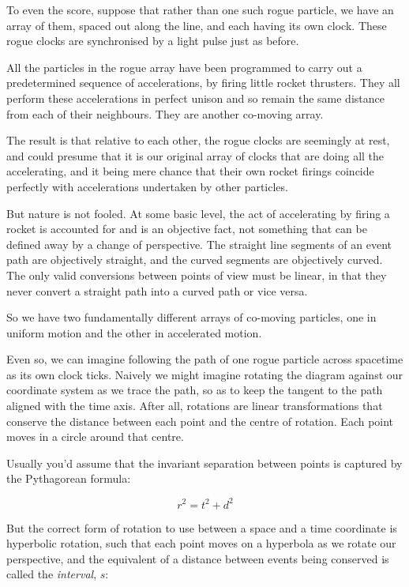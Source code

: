To even the score, suppose that rather than one such rogue particle, we have an array of them, spaced out along the line, and each having its own clock. These rogue clocks are synchronised by a light pulse just as before.

All the particles in the rogue array have been programmed to carry out a predetermined sequence of accelerations, by firing little rocket thrusters. They all perform these accelerations in perfect unison and so remain the same distance from each of their neighbours. They are another co-moving array.

The result is that relative to each other, the rogue clocks are seemingly at rest, and could presume that it is our original array of clocks that are doing all the accelerating, and it being mere chance that their own rocket firings coincide perfectly with accelerations undertaken by other particles.

But nature is not fooled. At some basic level, the act of accelerating by firing a rocket is accounted for and is an objective fact, not something that can be defined away by a change of perspective. The straight line segments of an event path are objectively straight, and the curved segments are objectively curved. The only valid conversions between points of view must be linear, in that they never convert a straight path into a curved path or vice versa.

So we have two fundamentally different arrays of co-moving particles, one in uniform motion and the other in accelerated motion.

Even so, we can imagine following the path of one rogue particle across spacetime as its own clock ticks. Naively we might imagine rotating the diagram against our coordinate system as we trace the path, so as to keep the tangent to the path aligned with the time axis. After all, rotations are linear transformations that conserve the distance between each point and the centre of rotation. Each point moves in a circle around that centre.

Usually you'd assume that the invariant separation between points is captured by the Pythagorean formula:

$$r^2 = t^2 + d^2$$

But the correct form of rotation to use between a space and a time coordinate is hyperbolic rotation, such that each point moves on a hyperbola as we rotate our perspective, and the equivalent of a distance between events being conserved is called the \textit{interval}, $s$:

